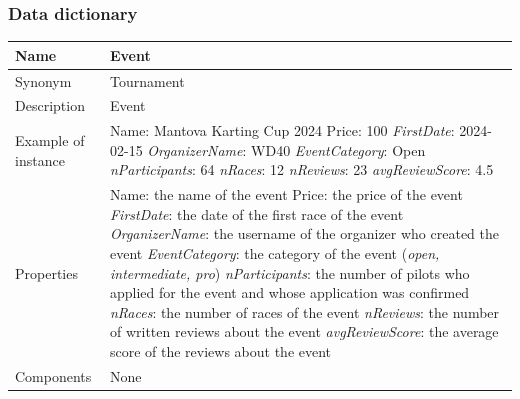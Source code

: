 \documentclass{beamer}
\begin{document}
\begin{frame}
\frametitle{Data dictionary}
\begin{table}
\tiny
\begin{tabular}{|p{2cm}|p{6cm}|}
\hline
Name & \textbf{Event} \\
\hline
Synonym & Tournament \\
\hline
Description & Event \\
\hline
Example of instance &
Name: Mantova Karting Cup 2024 \newline
Price: 100 \newline
\textit{FirstDate}: 2024-02-15 \newline
\textit{OrganizerName}: WD40 \newline
\textit{EventCategory}: Open \newline
\textit{nParticipants}: 64 \newline
\textit{nRaces}: 12 \newline
\textit{nReviews}: 23 \newline
\textit{avgReviewScore}: 4.5 \\
\hline
Properties &
Name: the name of the event \newline
Price: the price of the event \newline
\textit{FirstDate}: the date of the first race of the event \newline
\textit{OrganizerName}: the username of the organizer who created the event \newline
\textit{EventCategory}: the category of the event (\textit{open, intermediate, pro})\newline
\textit{nParticipants}: the number of pilots who applied for the event and whose application was confirmed\newline
\textit{nRaces}: the number of races of the event \newline
\textit{nReviews}: the number of written reviews about the event \newline
\textit{avgReviewScore}: the average score of the reviews about the event \\
\hline
Components & None \\
\hline
\end{tabular}
\end{table}
\end{frame}
\end{document}

